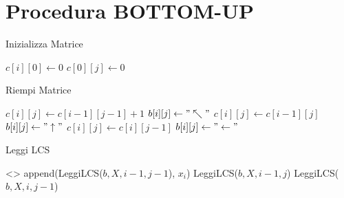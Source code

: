 \newpage

\section{Procedura BOTTOM-UP}

\begin{algorithm}
    \renewcommand\thealgorithm{}
    \caption{Inizializza Matrice}
    \begin{algorithmic}
                \State $c[i][0] \gets 0$
            \EndFor
                \State $c[0][j] \gets 0$
            \EndFor
        \EndProcedure
    \end{algorithmic}
\end{algorithm}

\begin{algorithm}
    \renewcommand\thealgorithm{}
    \caption{Riempi Matrice}
    \begin{algorithmic}
                    \State $c[i][j] \gets c[i-1][j-1] + 1$
                    \State $b[i][j] \gets "\nwarrow"$
                \Else
                        \State $c[i][j] \gets c[i-1][j]$
                        \State $b[i][j] \gets "\uparrow"$
                    \Else
                        \State $c[i][j] \gets c[i][j-1]$
                        \State $b[i][j] \gets "\leftarrow"$
                    \EndIf
                \EndIf
            \EndFor
        \EndFor
        \EndProcedure
    \end{algorithmic}
\end{algorithm}

\begin{algorithm}
    \renewcommand\thealgorithm{}
    \caption{Leggi LCS}
    \begin{algorithmic}
                \State \Return <>
            \EndIf
                \State \Return append(LeggiLCS($b, X, i-1, j-1$), $x_{i}$)
            \Else
                    \State \Return LeggiLCS($b, X, i-1, j$)
                \Else
                    \State \Return LeggiLCS($b, X, i, j-1$)
                \EndIf
            \EndIf
        \EndProcedure
    \end{algorithmic}
\end{algorithm}

